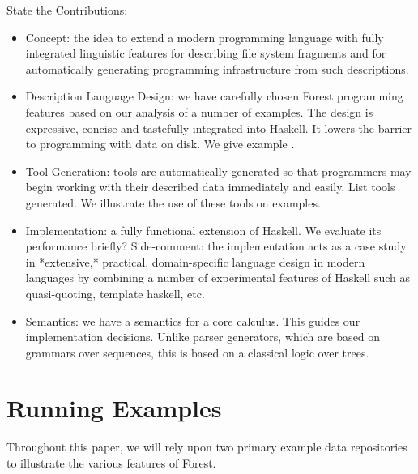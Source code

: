 \documentclass[natbib]{sigplanconf}
\begin{document}
State the Contributions:

\begin{itemize}
\item Concept:  the idea to extend a modern programming language with
fully integrated linguistic features for describing file system fragments
and for automatically generating programming infrastructure from such 
descriptions.

\item Description Language Design:  we have carefully chosen Forest programming
features based on our analysis of a number of examples.  The design
is expressive, concise and tastefully integrated into Haskell.
It lowers the barrier to programming with data on disk.  We give example
.

\item Tool Generation:  tools are automatically generated so that programmers
may begin working with their described data immediately and easily.  List
tools generated.  We illustrate the use of these tools on examples.

\item Implementation: a fully functional extension of Haskell.  
We evaluate its performance briefly?  Side-comment: the implementation
acts as a case study in *extensive,* practical,
domain-specific language design in modern languages by
combining a number of experimental features of Haskell such
as quasi-quoting, template haskell, etc.

\item Semantics: we have a semantics for a core calculus.  This
guides our implementation decisions.  Unlike parser generators,
which are based on grammars over sequences, this is based
on a classical logic over trees.
\end{itemize}

\section{Running Examples}
\label{sec:review}

Throughout this paper, we will rely upon two primary example data 
repositories to illustrate the various features of Forest.
\end{document}
